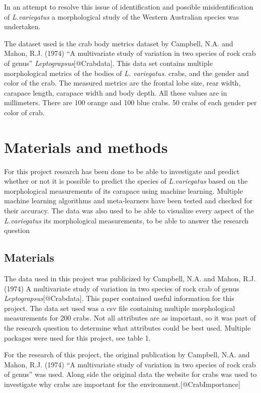 \documentclass[
]{article}
\begin{document}
In an attempt to resolve this issue of identification and possible
misidentification of \emph{L.variegatus} a morphological study of the
Western Australian species was undertaken.

The dataset used is the crab body metrics dataset by Campbell, N.A. and
Mahon, R.J. (1974) ``A multivariate study of variation in two species of
rock crab of genus'' \emph{Leptograpsus}{[}@Crabdata{]}. This data set
contains multiple morphological metrics of the bodies of \emph{L.
variegatus.} crabs, and the gender and color of the crab. The measured
metrics are the frontal lobe size, rear width, carapace length, carapace
width and body depth. All these values are in millimeters. There are 100
orange and 100 blue crabs. 50 crabs of each gender per color of crab.

\newpage

\hypertarget{materials-and-methods}{%
\section{Materials and methods}\label{materials-and-methods}}

For this project research has been done to be able to investigate and
predict whether or not it is possible to predict the species of
\emph{L.variegatus} based on the morphological measurements of its
carapace using machine learning. Multiple machine learning algorithms
and meta-learners have been tested and checked for their accuracy. The
data was also used to be able to visualize every aspect of the
\emph{L.variegatus} its morphological measurements, to be able to answer
the research question

\hypertarget{materials}{%
\subsection{Materials}\label{materials}}

The data used in this project was publicized by Campbell, N.A. and
Mahon, R.J. (1974) A multivariate study of variation in two species of
rock crab of genus \emph{Leptograpsus}{[}@Crabdata{]}. This paper
contained useful information for this project. The data set used was a
csv file containing multiple morphological measurements for 200 crabs.
Not all attributes are as important, so it was part of the research
question to determine what attributes could be best used. Multiple
packages were used for this project, see table 1.

For the research of this project, the original publication by Campbell,
N.A. and Mahon, R.J. (1974) ``A multivariate study of variation in two
species of rock crab of genus'' was used. Along side the original data
the website for crabs was used to investigate why crabs are important
for the environment.{[}@CrabImportance{]}
\end{document}
